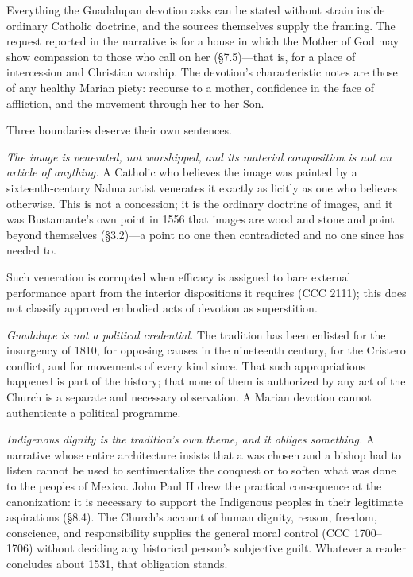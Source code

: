 Everything the Guadalupan devotion asks can be stated without strain
inside ordinary Catholic doctrine, and the sources themselves supply
the framing. The request reported in the narrative is for a house in
which the Mother of God may show compassion to those who call on her
(\S7.5)---that is, for a place of intercession and Christian worship.
The devotion's characteristic notes are those of any healthy Marian
piety: recourse to a mother, confidence in the face of affliction,
and the movement through her to her Son.

Three boundaries deserve their own sentences.

\emph{The image is venerated, not worshipped, and its material
composition is not an article of anything.} A Catholic who believes
the image was painted by a sixteenth-century Nahua artist venerates
it exactly as licitly as one who believes otherwise. This is not a
concession; it is the ordinary doctrine of images, and it was
Bustamante's own point in 1556 that images are wood and stone and
point beyond themselves (\S3.2)---a point no one then contradicted
and no one since has needed to.

Such veneration is corrupted when efficacy is assigned to bare external
performance apart from the interior dispositions it requires (CCC 2111);
this does not classify approved embodied acts of devotion as superstition.

\emph{Guadalupe is not a political credential.} The tradition has
been enlisted for the insurgency of 1810, for opposing causes in the
nineteenth century, for the Cristero conflict, and for movements of
every kind since. That such appropriations happened is part of the
history; that none of them is authorized by any act of the Church is
a separate and necessary observation. A Marian devotion cannot
authenticate a political programme.

\emph{Indigenous dignity is the tradition's own theme, and it obliges
something.} A narrative whose entire architecture insists that a
 was chosen and a bishop had to listen cannot be
used to sentimentalize the conquest or to soften what was done to the
peoples of Mexico. John Paul II drew the practical consequence at the
canonization: it is necessary to support the Indigenous peoples in
their legitimate aspirations (\S8.4). The Church's account of human
dignity, reason, freedom, conscience, and responsibility supplies the
general moral control (CCC 1700--1706) without deciding any historical
person's subjective guilt. Whatever a reader concludes
about 1531, that obligation stands.

